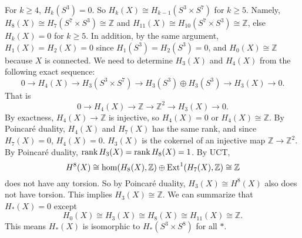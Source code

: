 \documentclass[letterpaper, 12pt]{article}
\begin{document}
\begin{solution}
\begin{enumerate}[(a)]
For \(k\geq 4\), \(H_k(S^3)=0\). So \(H_k(X)\cong H_{k-1}(S^3\times S^7)\) for \(k\geq 5\). Namely, \(H_8(X)\cong H_7(S^7\times S^3)\cong \mathbb{Z}\) and \(H_{11}(X)\cong H_{10}(S^7\times S^3)\cong \mathbb{Z}\), else \(H_k(X)=0\) for \(k\geq 5\). In addition, by the same argument, \(H_1(X)=H_2(X)=0\) since \(H_1(S^3)=H_2(S^3)=0\), and \(H_0(X)\cong \mathbb{Z}\) because \(X\) is connected. We need to determine \(H_3(X)\) and \(H_4(X)\) from the following exact sequence:
\[0\rightarrow H_4(X)\rightarrow H_3(S^3\times S^7)\rightarrow H_3(S^3)\oplus H_3(S^3)\rightarrow H_3(X)\rightarrow 0.\]
That is 
\[0\rightarrow H_4(X)\rightarrow \mathbb{Z}\rightarrow \mathbb{Z}^2\rightarrow H_3(X)\rightarrow 0.\]
By exactness, \(H_4(X)\rightarrow \mathbb{Z}\) is injective, so \(H_4(X)=0\) or \(H_4(X)\cong \mathbb{Z}\). By Poincaré duality, \(H_4(X)\) and \(H_7(X)\) has the same rank, and since \(H_7(X)=0\), \(H_4(X)=0\). \(H_3(X)\) is the cokernel of an injective map \(\mathbb{Z}\rightarrow \mathbb{Z}^2\). By Poincaré duality, \(\text{rank}\, H_3(X)=\text{rank}\, H_8(X)=1\). By UCT, 
\[H^8(X)\cong \hom(H_8(X),\mathbb{Z})\oplus \text{Ext}^1(H_7(X),\mathbb{Z})\cong \mathbb{Z}\]
does not have any torsion. So by Poincaré duality, \(H_3(X)\cong H^8(X)\) also does not have torsion. This implies \(H_3(X)\cong \mathbb{Z}\). We can summarize that \(H_*(X)=0\) except 
\[H_0(X)\cong H_3(X)\cong H_8(X)\cong H_{11}(X)\cong \mathbb{Z}.\]
This means \(H_*(X)\) is isomorphic to \(H_*(S^3\times S^8)\) for all \(*\). 
\end{enumerate}
\end{solution}
\end{document}
